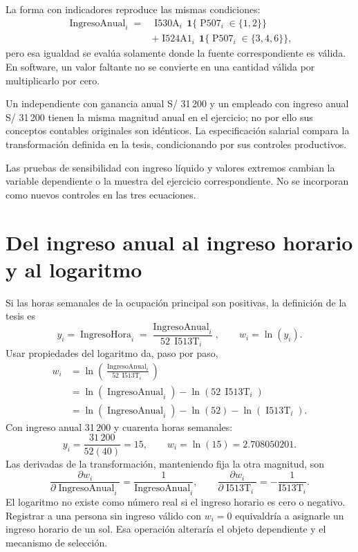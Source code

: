 \documentclass[11pt,a4paper]{article}
\begin{document}
La forma con indicadores reproduce las mismas condiciones:
\[
\begin{aligned}
\operatorname{IngresoAnual}_i={}&
\operatorname{I530A}_i\,\mathbf1\{\operatorname{P507}_i\in\{1,2\}\}\\
&+\operatorname{I524A1}_i\,\mathbf1\{\operatorname{P507}_i\in\{3,4,6\}\},
\end{aligned}
\]
pero esa igualdad se evalúa solamente donde la fuente correspondiente es válida. En software, un valor faltante no se convierte en una cantidad válida por multiplicarlo por cero.

Un independiente con ganancia anual S/ 31\,200 y un empleado con ingreso anual S/ 31\,200 tienen la misma magnitud anual en el ejercicio; no por ello sus conceptos contables originales son idénticos. La especificación salarial compara la transformación definida en la tesis, condicionando por sus controles productivos.

Las pruebas de sensibilidad con ingreso líquido y valores extremos cambian la variable dependiente o la muestra del ejercicio correspondiente. No se incorporan como nuevos controles en las tres ecuaciones.

\clearpage
\section{Del ingreso anual al ingreso horario y al logaritmo}

Si las horas semanales de la ocupación principal son positivas, la definición de la tesis es
\[
y_i=\operatorname{IngresoHora}_i=
\frac{\operatorname{IngresoAnual}_i}{52\,\operatorname{I513T}_i},
\qquad w_i=\ln(y_i).
\]
Usar propiedades del logaritmo da, paso por paso,
\[
\begin{aligned}
w_i
&=\ln\left(\frac{\operatorname{IngresoAnual}_i}{52\,\operatorname{I513T}_i}\right)\\
&=\ln(\operatorname{IngresoAnual}_i)-\ln(52\,\operatorname{I513T}_i)\\
&=\ln(\operatorname{IngresoAnual}_i)-\ln(52)-\ln(\operatorname{I513T}_i).
\end{aligned}
\]
Con ingreso anual 31\,200 y cuarenta horas semanales:
\[
y_i=\frac{31\,200}{52(40)}=15,\qquad w_i=\ln(15)=2.708050201.
\]
Las derivadas de la transformación, manteniendo fija la otra magnitud, son
\[
\frac{\partial w_i}{\partial\operatorname{IngresoAnual}_i}
=\frac1{\operatorname{IngresoAnual}_i},\qquad
\frac{\partial w_i}{\partial\operatorname{I513T}_i}
=-\frac1{\operatorname{I513T}_i}.
\]
El logaritmo no existe como número real si el ingreso horario es cero o negativo. Registrar a una persona sin ingreso válido con $w_i=0$ equivaldría a asignarle un ingreso horario de un sol. Esa operación alteraría el objeto dependiente y el mecanismo de selección.
\end{document}

